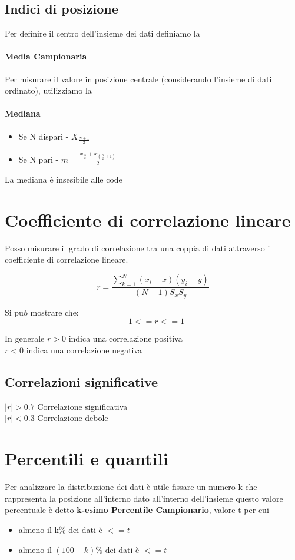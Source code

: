 \documentclass[12pt, a4paper, openany]{book}
\begin{document}
\subsection{Indici di posizione}
Per definire il centro dell'insieme dei dati definiamo la 
\paragraph{\textbf{Media Campionaria}}  %

Per misurare il valore in posizione centrale (considerando l'insieme di dati ordinato), utilizziamo la
\paragraph{\textbf{Mediana}}
\begin{itemize}
    \item Se N dispari - {$X_\frac{N+1}{2}$}
    \item Se N pari - $m = \frac{x_\frac{N}{2}+x_(\frac{N}{2}+1)}{2}$
\end{itemize}

La mediana è insesibile alle code

\section{Coefficiente di correlazione lineare}
Posso misurare il grado di correlazione tra una coppia di dati attraverso il coefficiente di correlazione lineare. 

\begin{equation}
    r = \frac{\sum_{k=1}^N (x_i - x)(y_i - y)}{(N -1)S_x S_y}
\end{equation}

Si può mostrare che:
\begin{equation}
    -1<=r<=1
\end{equation}

In generale $r > 0$ indica una correlazione positiva
\\ $r < 0$ indica una correlazione negativa 

\subsection{Correlazioni significative}
$|r| > 0.7$ Correlazione significativa
\\$|r| < 0.3$ Correlazione debole

\section{Percentili e quantili}
Per analizzare la distribuzione dei dati è utile fissare un numero k che rappresenta la posizione all'interno dato all'interno dell'insieme
questo valore percentuale è detto \textbf{k-esimo Percentile Campionario}, valore t per cui
\begin{itemize}
    \item almeno il k\% dei dati è $ <= t$
    \item almeno il $(100 -k)\%$ dei dati è $<= t$
\end{itemize}
\end{document}
